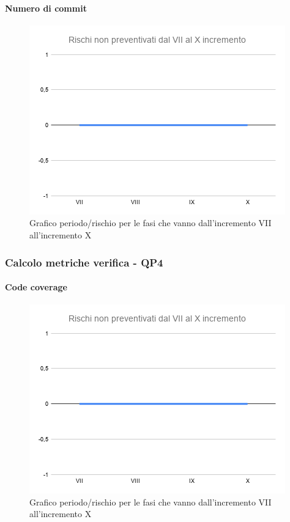 \paragraph{Numero di commit}
\begin{figure}[H]
			\centering%
			\includegraphics[width=0.8\linewidth]{./res/images/RischiNonPreven_4.png}
			\caption{Grafico periodo/rischio per le fasi che vanno dall'incremento VII all'incremento X}
			\label{fig:Grafico periodo/rischio per le fasi che vanno dall'incremento VII all'incremento X}
	\end{figure}

\subsubsection{Calcolo metriche verifica - QP4}	
\paragraph{Code coverage}
\begin{figure}[H]
			\centering%
			\includegraphics[width=0.8\linewidth]{./res/images/RischiNonPreven_4.png}
			\caption{Grafico periodo/rischio per le fasi che vanno dall'incremento VII all'incremento X}
			\label{fig:Grafico periodo/rischio per le fasi che vanno dall'incremento VII all'incremento X}
	\end{figure}
